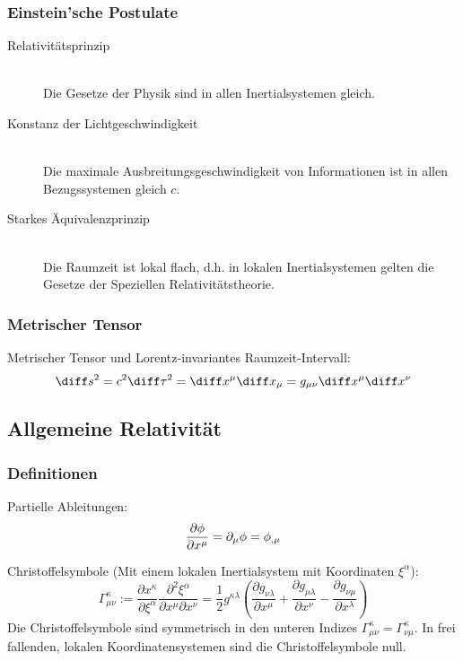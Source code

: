 \documentclass[11pt]{article}
\numberwithin{equation}{section}
\begin{document}
			\subsubsection{Einstein'sche Postulate}
        \begin{description}
          \item[Relativitätsprinzip]\hfill \\
            Die Gesetze der Physik sind in allen Inertialsystemen gleich.
          \item[Konstanz der Lichtgeschwindigkeit]\hfill \\
            Die maximale Ausbreitungsgeschwindigkeit von Informationen ist in allen Bezugssystemen gleich $c$.
          \item[Starkes Äquivalenzprinzip]\hfill \\
            Die Raumzeit ist lokal flach, d.h. in lokalen Inertialsystemen gelten die Gesetze der Speziellen Relativitätstheorie.
        \end{description}

      \subsubsection{Metrischer Tensor}
        Metrischer Tensor und Lorentz-invariantes Raumzeit-Intervall:
        \begin{equation}
          \diff s^2 = c^2 \diff \tau^2 = \diff x^\mu \diff x_\mu = g_{\mu\nu} \diff x^\mu \diff x^\nu
        \end{equation}

      \subsection{Allgemeine Relativität}
        \subsubsection{Definitionen}
          Partielle Ableitungen:
          \begin{equation}
            \frac{\partial \phi}{\partial x^\mu} = \partial_\mu \phi = \phi_{,\mu}
          \end{equation}

          Christoffelsymbole (Mit einem lokalen Inertialsystem mit Koordinaten $\xi^\alpha$):
          \begin{equation}
            \Gamma_{\mu\nu}^{\kappa} := \frac{\partial x^\kappa}{\partial \xi^\alpha}\frac{\partial^2 \xi^\alpha}{\partial x^\mu\partial x^\nu}=\frac{1}{2}g^{\kappa\lambda}\left(\frac{\partial g_{\nu\lambda}}{\partial x^\mu}+\frac{\partial g_{\mu\lambda}}{\partial x^\nu}-\frac{\partial g_{\nu\mu}}{\partial x^\lambda}\right)
          \end{equation}
          Die Christoffelsymbole sind symmetrisch in den unteren Indizes $\Gamma_{\mu\nu}^{\kappa} = \Gamma_{\nu\mu}^{\kappa}$. In frei fallenden, lokalen Koordinatensystemen sind die Christoffelsymbole null.
\end{document}
